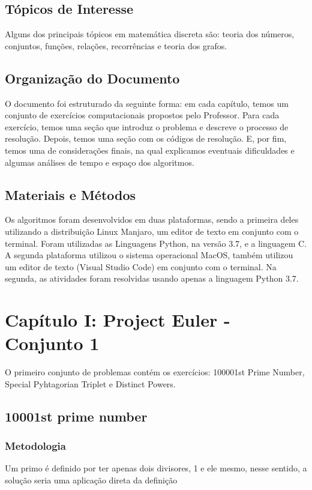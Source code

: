 \documentclass{article}
\begin{document}
    \subsection{Tópicos de Interesse}
    Alguns dos principais tópicos em matemática discreta são: teoria dos números, conjuntos, funções, relações, recorrências e teoria dos grafos.
    
    \subsection{Organização do Documento}
    O documento foi estruturado da seguinte forma: em cada capítulo, temos um conjunto de exercícios computacionais propostos pelo Professor. Para cada exercício, temos uma seção que introduz o problema e descreve o processo de resolução.
    Depois, temos uma seção com os códigos de resolução. E, por fim, temos uma de considerações finais, na qual explicamos eventuais dificuldades e algumas análises de tempo e espaço dos algoritmos.
    
    \subsection{Materiais e Métodos}
    Os algoritmos foram desenvolvidos em duas plataformas, sendo a primeira deles utilizando a distribuição Linux Manjaro, um editor de texto em conjunto com o terminal. Foram utilizadas as Linguagens Python, na versão 3.7, e a linguagem C. A segunda plataforma utilizou o sistema operacional MacOS, também utilizou um editor de texto (Visual Studio Code) em conjunto com o terminal. Na segunda, as atividades foram resolvidas usando apenas a linguagem Python 3.7.

\section{Capítulo I: Project Euler - Conjunto 1}
O primeiro conjunto de problemas contém os exercícios: 100001st Prime Number, Special Pyhtagorian Triplet e Distinct Powers.
    \subsection{10001st prime number }
       
        \subsubsection{Metodologia} 
        Um primo é definido por ter apenas dois divisores, 1 e ele mesmo, nesse sentido, a solução seria uma aplicação direta da definição
       
\end{document}
